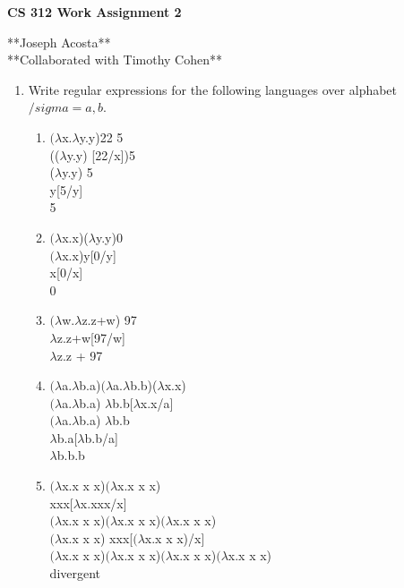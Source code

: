 \documentclass[11pt]{article}
\begin{document}
\begin{center}             %
\begin{LARGE}
{\bf CS 312 Work Assignment 2}
\end{LARGE}
\vskip 0.25cm      %

**Joseph Acosta**\\
**Collaborated with Timothy Cohen**\\
\end{center}

\begin{enumerate}

\item Write regular expressions for the following languages over alphabet $/sigma = {a,b}$.
\begin{enumerate}
\item $(\lambda $x.$\lambda$y.y)22 5 \hspace{12pt}\\
(($\lambda$y.y) [22/x])5\\
($\lambda$y.y) 5\\
y[5/y]\\
5
\item $(\lambda $x.x)($\lambda$y.y)0 \hspace{12pt}\\
$(\lambda $x.x)y[0/y]\\
x[0/x]\\
0
\item $(\lambda$w.$\lambda$z.z+w) 97\hspace{12pt}\\
$\lambda$z.z+w[97/w]\\
$\lambda$z.z + 97\\
\item $(\lambda$a.$\lambda$b.a)$(\lambda$a.$\lambda$b.b)($\lambda$x.x) \hspace{12pt}\\
$(\lambda$a.$\lambda$b.a) $\lambda$b.b[$\lambda$x.x/a]\\
$(\lambda$a.$\lambda$b.a) $\lambda$b.b\\
$\lambda$b.a[$\lambda$b.b/a]\\
$\lambda$b.b.b\\

\item $(\lambda$x.x x x)$(\lambda$x.x x x) \hspace{12pt}\\
xxx[$\lambda$x.xxx/x]\\
$(\lambda$x.x x x)$(\lambda$x.x x x)$(\lambda$x.x x x)\\
$(\lambda$x.x x x) xxx[$(\lambda$x.x x x)/x]\\
$(\lambda$x.x x x)$(\lambda$x.x x x)$(\lambda$x.x x x)$(\lambda$x.x x x)\\
divergent\\


\end{enumerate}
\end{enumerate}
\end{document}
